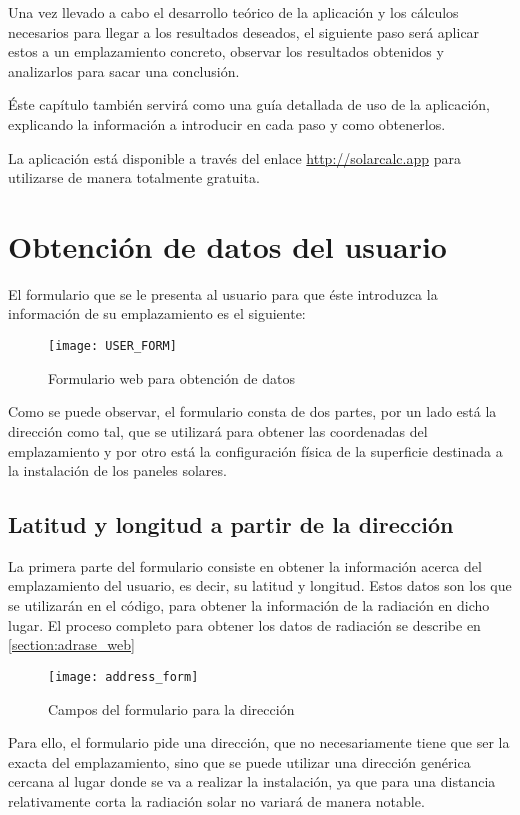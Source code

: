 Una vez llevado a cabo el desarrollo teórico de la aplicación y los cálculos necesarios para llegar a los resultados deseados, el siguiente paso será aplicar estos a un emplazamiento concreto, observar los resultados obtenidos y analizarlos para sacar una conclusión.

Éste capítulo también servirá como una guía detallada de uso de la aplicación, explicando la información a introducir en cada paso y como obtenerlos.

La aplicación está disponible a través del enlace \url{http://solarcalc.app} para utilizarse de manera totalmente gratuita.

\section{Obtención de datos del usuario}

El formulario que se le presenta al usuario para que éste introduzca la información de su emplazamiento es el siguiente:
\begin{figure}[ht]
\texttt{[image: USER\_FORM]}
\centering
\caption{Formulario web para obtención de datos}
\label{fig:user_form}
\end{figure}

Como se puede observar, el formulario consta de dos partes, por un lado está la dirección como tal, que se utilizará para obtener las coordenadas del emplazamiento y por otro está la configuración física de la superficie destinada a la instalación de los paneles solares.

\subsection{Latitud y longitud a partir de la dirección}

La primera parte del formulario consiste en obtener la información acerca del emplazamiento del usuario, es decir, su latitud y longitud. Estos datos son los que se utilizarán en el código, para obtener la información de la radiación en dicho lugar. El proceso completo para obtener los datos de radiación se describe en \ref{section:adrase_web}

\begin{figure}[ht]
\texttt{[image: address\_form]}
\centering
\caption{Campos del formulario para la dirección}
\label{fig:address_form}
\end{figure}

Para ello, el formulario pide una dirección, que no necesariamente tiene que ser la exacta del emplazamiento, sino que se puede utilizar una dirección genérica cercana al lugar donde se va a realizar la instalación, ya que para una distancia relativamente corta la radiación solar no variará de manera notable.

